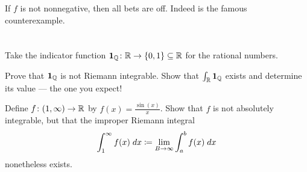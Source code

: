If $f$ is not nonnegative, then all bets are off.
Indeed  is the famous counterexample.

\section{\problemhead}

\begin{sproblem}
	\label{prob:1QQ}
	Take the indicator function
	$\mathbf 1_{\mathbb Q} \colon \mathbb R \to \{0,1\} \subseteq \mathbb R$
	for the rational numbers.
		\begin{enumerate}[(a)]
	   \ii Prove that $\mathbf{1}_\mathbb Q$ is not Riemann integrable.
	   \ii Show that $\int_\mathbb R \mathbf{1}_\mathbb Q$ exists
	   and determine its value --- the one you expect!
   \end{enumerate}
\end{sproblem}

\begin{dproblem}
	\label{prob:sin_improper}
	Define $f \colon (1,\infty) \to \mathbb R$ by $f(x) = \frac{\sin(x)}{x}$.
	Show that $f$ is not absolutely integrable,
	but that the improper Riemann integral
	\[ \int_1^\infty f(x) \; dx \coloneqq
		\lim_{B \to \infty}
		\int_a^b f(x) \; dx \]
	nonetheless exists.
\end{dproblem}
